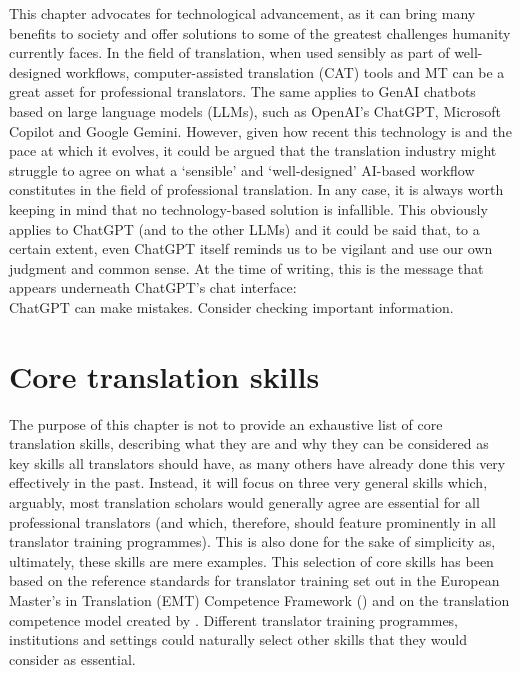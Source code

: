 \documentclass[output=paper]{langscibook}
\begin{document}
This chapter advocates for technological advancement, as it can bring many benefits to society and offer solutions to some of the greatest challenges humanity currently faces. In the field of translation, when used sensibly as part of well-designed workflows, computer-assisted translation (CAT) tools and MT can be a great asset for professional translators. The same applies to GenAI chatbots based on large language models (LLMs), such as OpenAI’s ChatGPT, Microsoft Copilot and Google Gemini. However, given how recent this technology is and the pace at which it evolves, it could be argued that the translation industry might struggle to agree on what a ‘sensible’ and ‘well-designed’ AI-based workflow constitutes in the field of professional translation. In any case, it is always worth keeping in mind that no technology-based solution is infallible. This obviously applies to ChatGPT (and to the other LLMs) and it could be said that, to a certain extent, even ChatGPT itself reminds us to be vigilant and use our own judgment and common sense. At the time of writing, this is the message that appears underneath ChatGPT’s chat interface:
\\
ChatGPT can make mistakes. Consider checking important information.

\section{Core translation skills}
The purpose of this chapter is not to provide an exhaustive list of core translation skills, describing what they are and why they can be considered as key skills all translators should have, as many others have already done this very effectively in the past. Instead, it will focus on three very general skills which, arguably, most translation scholars would generally agree are essential for all professional translators (and which, therefore, should feature prominently in all translator training programmes). This is also done for the sake of simplicity as, ultimately, these skills are mere examples. This selection of core skills has been based on the reference standards for translator training set out in the European Master's in Translation (EMT) Competence Framework (\citeyear{emt_european_2022}) and on the translation competence model created by \citet{pacte03}. Different translator training programmes, institutions and settings could naturally select other skills that they would consider as essential.
\end{document}
